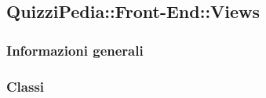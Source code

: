 \newpage

\subsection{QuizziPedia::Front-End::Views}
\subsubsection{Informazioni generali}
\subsubsection{Classi}